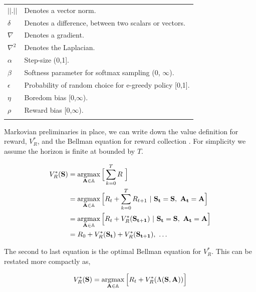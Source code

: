 \begin{table}[]
\begin{tabular}{ll}
    $||.||$ & Denotes a vector norm. \\
    $\delta$ & Denotes a difference, between two scalars or vectors. \\
    $\nabla$ & Denotes a gradient. \\
    $\nabla^2$ & Denotes the Laplacian. \\
    $\alpha$ & Step-size (0,1]. \\
    $\beta$ & Softness parameter for softmax sampling (0, $\infty$). \\
    $\epsilon$ & Probability of random choice for e-greedy policy [0,1]. \\
    $\eta$ & Boredom bias [0,$\infty$). \\
    $\rho$ & Reward bias [0,$\infty$). \\
    &                          
    \end{tabular}
	\label{tab:notation}
\end{table}
 
Markovian preliminaries in place, we can write down the value definition for reward, $V^*_{R}$, and the Bellman equation \cite{Bellmann1954} for reward collection \cite{Sutton2018}. For simplicity we assume the horizon is finite at bounded by $T$.

\begin{equation} 
	\label{eq:bellman_seq}
    \begin{split}
        V^*_{R}(\mathbf{S}) &= \argmax_{\mathbf{A} \in \mathbb{A}} \Big [\sum_{k=0}^{T}  R \ \Big ]\\
                         	&= \argmax_{\mathbf{A} \in \mathbb{A}} \Big [ R_{t} + \sum_{k=0}^{T} R_{t+1} \ | \ \mathbf{S_t} = \mathbf{S},\ \mathbf{A_t} = \mathbf{A} \Big ]\\
							&= \argmax_{\mathbf{A} \in \mathbb{A}} \Big [ R_{t} + V^*_{R}(\mathbf{S_{t+1}}) \ | \ \mathbf{S_t} = \mathbf{S},\ \mathbf{A_t} = \mathbf{A} \Big ]\\
                         	&= R_0 + V^*_{R}(\mathbf{S_{t}}) + V^*_{R}(\mathbf{S_{t+1}}),\ \ldots
    \end{split}
\end{equation}

The second to last equation is the optimal Bellman equation for $V^*_R$. This can be restated more compactly as,

\begin{equation} 
\label{eq:bellman_iter}
V^*_R(\mathbf{S}) = \operatorname*{argmax}_{\mathbf{A} \in \mathbb{A}} \Big [ R_{t}  + V^*_{R}(\Lambda(\mathbf{S},\mathbf{A})) \Big ]
\end{equation}

